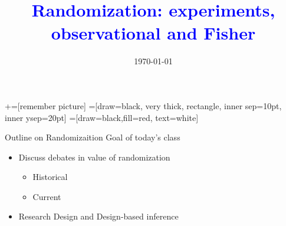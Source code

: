 \documentclass[notes,11pt, aspectratio=169]{beamer}
\title[]{\textcolor{blue}{Randomization: experiments, observational and Fisher}}
\author[PGP]{}
\institute[FRBNY]{\small{Paul Goldsmith-Pinkham}}
\date{\today}
\begin{document}
\newcommand\marktopleft[1]{%
    \tikz[overlay,remember picture] 
        \node (marker-#1-a) at (-.3em,.3em) {};%
}
\newcommand\markbottomright[2]{%
    \tikz[overlay,remember picture] 
        \node (marker-#1-b) at (0em,0em) {};%
}
+=[remember picture] 
 =[draw=black, very thick, rectangle, inner sep=10pt, inner ysep=20pt]
 =[draw=black,fill=red, text=white]

\begin{frame}
\maketitle

\end{frame}

\begin{frame}{Outline on Randomizaition}
  Goal of today's class
  \begin{itemize}
  \item Discuss debates in value of randomization
    \begin{itemize}
    \item Historical
    \item Current
    \end{itemize}
  \item Research Design and Design-based inference
  \end{itemize}
\end{frame}
\end{document}
